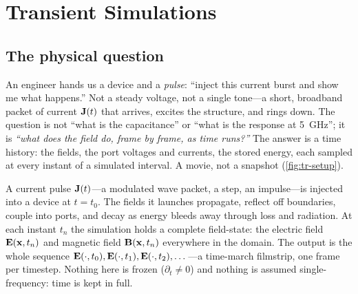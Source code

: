 \chapter{Transient Simulations}
\label{ch:transient}



\section{The physical question}
\label{sec:tr-question}

An engineer hands us a device and a \emph{pulse}: ``inject this current burst and
show me what happens.'' Not a steady voltage, not a single tone---a short,
broadband packet of current $\mathbf{J}(t)$ that arrives, excites the structure, and
rings down. The question is not ``what is the capacitance'' or ``what is the
response at \SI{5}{GHz}''; it is \emph{``what does the field do, frame by frame,
as time runs?''} The answer is a time history: the fields, the port voltages and
currents, the stored energy, each sampled at every instant of a simulated
interval. A movie, not a snapshot (\cref{fig:tr-setup}).

\begin{physicsbox}
A current pulse $\mathbf{J}(t)$---a modulated wave packet, a step, an impulse---is
injected into a device at $t=t_0$. The fields it launches propagate, reflect off
boundaries, couple into ports, and decay as energy bleeds away through loss and
radiation. At each instant $t_n$ the simulation holds a complete field-state: the
electric field $\mathbf{E}(\mathbf{x},t_n)$ and magnetic field $\mathbf{B}(\mathbf{x},t_n)$ everywhere in the
domain. The output is the whole sequence
$\mathbf{E}(\cdot,t_0),\mathbf{E}(\cdot,t_1),\mathbf{E}(\cdot,t_2),\dots$---a time-march filmstrip, one
frame per timestep. Nothing here is frozen ($\partial_t\neq0$) and nothing is
assumed single-frequency: time is kept in full.
\end{physicsbox}

